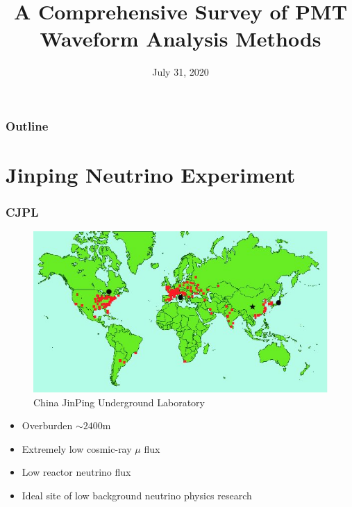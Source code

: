 \documentclass[handout]{beamer}
\title[Waveform Analysis]{A Comprehensive Survey of PMT Waveform Analysis Methods}
\date[DANCE]{July 31, 2020}
\begin{document}
\frame{\titlepage}

\begin{frame}
\frametitle{Outline}
\tableofcontents
\end{frame}

\section{Jinping Neutrino Experiment}
\begin{frame}
\frametitle{CJPL}
\begin{figure}
    \centering
    \caption{China JinPing Underground Laboratory}
    \includegraphics[width=0.65\linewidth]{img/WorldMap.jpg}
\end{figure}
\begin{itemize}
    \item Overburden $\sim2400\mathrm{m}$
    \item Extremely low cosmic-ray $\mu$ flux
    \item Low reactor neutrino flux
    \item Ideal site of low background neutrino physics research
\end{itemize}
\end{frame}
\end{document}
